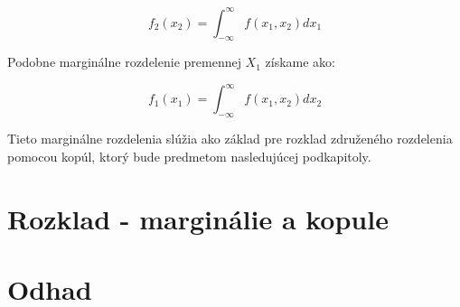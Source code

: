 \begin{equation} f_2(x_2) = \int_{-\infty}^{\infty} f(x_1, x_2) dx_1 \end{equation}

Podobne marginálne rozdelenie premennej $X_1$ získame ako:

\begin{equation} f_1(x_1) = \int_{-\infty}^{\infty} f(x_1, x_2)  dx_2 \end{equation}

Tieto marginálne rozdelenia slúžia ako základ pre rozklad združeného rozdelenia pomocou kopúl, ktorý bude predmetom nasledujúcej podkapitoly.

\section{Rozklad - marginálie a kopule}\label{sec:rozklad_kopule}
\section{Odhad}\label{sec:odhad}